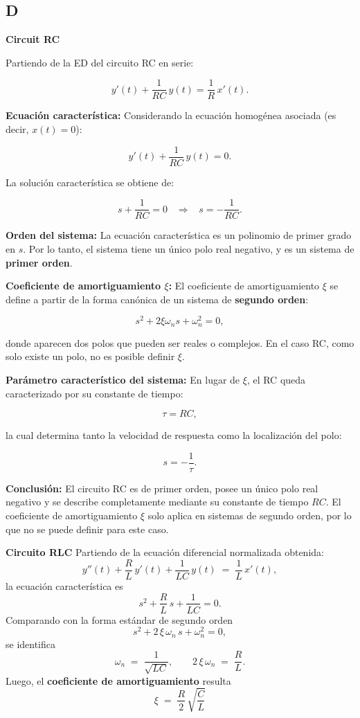 \subsection{D}

\textbf{Circuit RC}

Partiendo de la ED del circuito RC en serie:

\[
y'(t) + \frac{1}{RC}\,y(t) = \frac{1}{R}\,x'(t).
\]

\textbf{Ecuación característica:}  
Considerando la ecuación homogénea asociada (es decir, $x(t)=0$):

\[
y'(t) + \frac{1}{RC}\,y(t) = 0.
\]

La solución característica se obtiene de:

\[
s + \frac{1}{RC} = 0 
\;\;\;\Rightarrow\;\;\; s = -\frac{1}{RC}.
\]

\textbf{Orden del sistema:}  
La ecuación característica es un polinomio de primer grado en $s$.  
Por lo tanto, el sistema tiene un único polo real negativo, y es un sistema de \textbf{primer orden}.  

\textbf{Coeficiente de amortiguamiento $\xi$:}  
El coeficiente de amortiguamiento $\xi$ se define a partir de la forma canónica de un sistema de \textbf{segundo orden}:

\[
s^2 + 2\xi \omega_n s + \omega_n^2 = 0,
\]

donde aparecen dos polos que pueden ser reales o complejos.  
En el caso RC, como solo existe un polo, no es posible definir $\xi$.

\textbf{Parámetro característico del sistema:}  
En lugar de $\xi$, el RC queda caracterizado por su constante de tiempo:

\[
\tau = RC,
\]

la cual determina tanto la velocidad de respuesta como la localización del polo:

\[
s = -\frac{1}{\tau}.
\]

\textbf{Conclusión:}  
El circuito RC es de primer orden, posee un único polo real negativo y se describe completamente mediante su constante de tiempo $RC$.  
El coeficiente de amortiguamiento $\xi$ solo aplica en sistemas de segundo orden, por lo que no se puede definir para este caso.


\bigskip

\textbf{Circuito RLC}
Partiendo de la ecuación diferencial normalizada obtenida:
\[
y''(t) + \frac{R}{L}\,y'(t) + \frac{1}{LC}\,y(t) \;=\; \frac{1}{L}\,x'(t),
\]
la ecuación característica es 
\[
s^{2} + \frac{R}{L}\,s + \frac{1}{LC} = 0.
\]
Comparando con la forma estándar de segundo orden
\[
s^{2} + 2\,\xi\,\omega_n\,s + \omega_n^{2} = 0,
\]
se identifica
\[
\omega_n \;=\; \frac{1}{\sqrt{LC}}, 
\qquad
2\,\xi\,\omega_n \;=\; \frac{R}{L}.
\]
Luego, el \textbf{coeficiente de amortiguamiento} resulta
\[
\boxed{\;\xi \;=\; \frac{R}{2}\,\sqrt{\frac{C}{L}}\;}
\]

